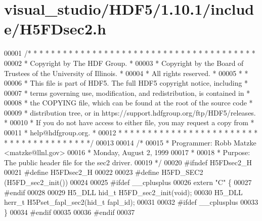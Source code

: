 \hypertarget{visual__studio_2_h_d_f5_21_810_81_2include_2_h5_f_dsec2_8h_source}{}\section{visual\+\_\+studio/\+H\+D\+F5/1.10.1/include/\+H5\+F\+Dsec2.h}
\label{visual__studio_2_h_d_f5_21_810_81_2include_2_h5_f_dsec2_8h_source}

\begin{DoxyCode}
00001 \textcolor{comment}{/* * * * * * * * * * * * * * * * * * * * * * * * * * * * * * * * * * * * * * *}
00002 \textcolor{comment}{ * Copyright by The HDF Group.                                               *}
00003 \textcolor{comment}{ * Copyright by the Board of Trustees of the University of Illinois.         *}
00004 \textcolor{comment}{ * All rights reserved.                                                      *}
00005 \textcolor{comment}{ *                                                                           *}
00006 \textcolor{comment}{ * This file is part of HDF5.  The full HDF5 copyright notice, including     *}
00007 \textcolor{comment}{ * terms governing use, modification, and redistribution, is contained in    *}
00008 \textcolor{comment}{ * the COPYING file, which can be found at the root of the source code       *}
00009 \textcolor{comment}{ * distribution tree, or in https://support.hdfgroup.org/ftp/HDF5/releases.  *}
00010 \textcolor{comment}{ * If you do not have access to either file, you may request a copy from     *}
00011 \textcolor{comment}{ * help@hdfgroup.org.                                                        *}
00012 \textcolor{comment}{ * * * * * * * * * * * * * * * * * * * * * * * * * * * * * * * * * * * * * * */}
00013 
00014 \textcolor{comment}{/*}
00015 \textcolor{comment}{ * Programmer:  Robb Matzke <matzke@llnl.gov>}
00016 \textcolor{comment}{ *              Monday, August  2, 1999}
00017 \textcolor{comment}{ *}
00018 \textcolor{comment}{ * Purpose: The public header file for the sec2 driver.}
00019 \textcolor{comment}{ */}
00020 \textcolor{preprocessor}{#ifndef H5FDsec2\_H}
00021 \textcolor{preprocessor}{#define H5FDsec2\_H}
00022 
00023 \textcolor{preprocessor}{#define H5FD\_SEC2   (H5FD\_sec2\_init())}
00024 
00025 \textcolor{preprocessor}{#ifdef \_\_cplusplus}
00026 \textcolor{keyword}{extern} \textcolor{stringliteral}{"C"} \{
00027 \textcolor{preprocessor}{#endif}
00028 
00029 H5\_DLL hid\_t H5FD\_sec2\_init(\textcolor{keywordtype}{void});
00030 H5\_DLL herr\_t H5Pset\_fapl\_sec2(hid\_t fapl\_id);
00031 
00032 \textcolor{preprocessor}{#ifdef \_\_cplusplus}
00033 \}
00034 \textcolor{preprocessor}{#endif}
00035 
00036 \textcolor{preprocessor}{#endif}
00037 
\end{DoxyCode}
